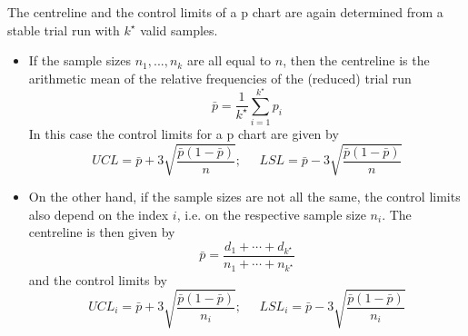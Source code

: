The centreline and the control limits of a p chart are again determined from a stable trial run with $k^\star$ valid samples.\\
\begin{itemize}
  \item If the sample sizes $n_1,...,n_k$ are all equal to $n$, then the centreline is the arithmetic mean of the relative frequencies of the (reduced) trial run
  \begin{equation}
    \bar{p} = \frac{1}{k^\star} \sum^{k^\star}_{i=1}p_i
  \end{equation}
  In this case the control limits for a p chart are given by
  \begin{equation}
    UCL = \bar{p} + 3\sqrt{\frac{\bar{p}(1-\bar{p})}{n}}; \;\;\;\;\; LSL = \bar{p} - 3\sqrt{\frac{\bar{p}(1-\bar{p})}{n}}
  \end{equation}
  \item On the other hand, if the sample sizes are not all the same, the control limits also depend on the index $i$, i.e. on the respective sample size $n_i$. The centreline is then given by
  \begin{equation}
    \bar{p} = \frac{d_1 + \cdots + d_{k^\star}}{n_1 + \cdots + n_{k^\star}}
  \end{equation}
  and the control limits by
  \begin{equation}
    UCL_i = \bar{p} + 3\sqrt{\frac{\bar{p}(1-\bar{p})}{n_i}}; \;\;\;\;\; LSL_i = \bar{p} - 3\sqrt{\frac{\bar{p}(1-\bar{p})}{n_i}}
  \end{equation}
\end{itemize}
